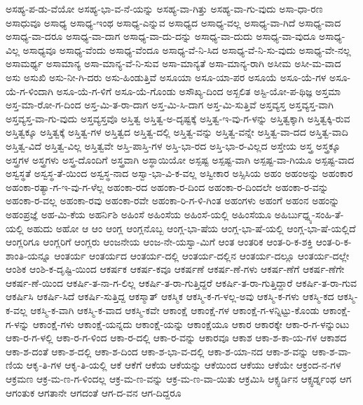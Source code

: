 {ಅಸಹ್ಯ-ಪ-ಡು-ವೆಯೋ
ಅಸಹ್ಯ-ಭಾ-ವ-ನೆ-ಯನ್ನು
ಅಸಹ್ಯ-ವಾ-ಗಿತ್ತು
ಅಸಹ್ಯ-ವಾ-ಗು-ವುದು
ಅಸಾ-ಧಾ-ರಣ
ಅಸಾಧುವೂ
ಅಸಾಧ್ಯ
ಅಸಾಧ್ಯ-ಇಂಥ
ಅಸಾಧ್ಯ-ಎನ್ನುವ
ಅಸಾಧ್ಯದ
ಅಸಾಧ್ಯ-ವಲ್ಲ
ಅಸಾಧ್ಯ-ವಾ-ಗಿದೆ
ಅಸಾಧ್ಯ-ವಾದ
ಅಸಾಧ್ಯ-ವಾ-ದರೂ
ಅಸಾಧ್ಯ-ವಾ-ದಾಗ
ಅಸಾಧ್ಯ-ವಾ-ದು-ದನ್ನು
ಅಸಾಧ್ಯ-ವಾ-ದುದು
ಅಸಾಧ್ಯ-ವಾ-ವುದೂ
ಅಸಾಧ್ಯ-ವಿಲ್ಲ
ಅಸಾಧ್ಯವೂ
ಅಸಾಧ್ಯ-ವೆಂದು
ಅಸಾಧ್ಯ-ವೆಂದೂ
ಅಸಾಧ್ಯ-ವೆ-ನಿ-ಸಿದ
ಅಸಾಧ್ಯ-ವೆ-ನಿ-ಸು-ವುದು
ಅಸಾಧ್ಯ-ವೇ-ನಲ್ಲ
ಅಸಾಮರ್ಥ್ಯ
ಅಸಾಮಾನ್ಯ
ಅಸಾ-ಮಾನ್ಯ-ವೆ-ನಿ-ಸುವ
ಅಸಾ-ಮಾನ್ಯತೆ
ಅಸಾ-ಮಾನ್ಯ-ರಾಗಿ
ಅಸೀಮ
ಅಸೀ-ಮ-ವಾದ
ಅಸು
ಅಸುಖಿ
ಅಸು-ನೀ-ಗಿ-ದರು
ಅಸು-ಹಿಂಡುತ್ತಿವೆ
ಅಸೂಯಾ
ಅಸೂ-ಯಾ-ಪರ
ಅಸೂಯೆ
ಅಸೂ-ಯೆ-ಗಳ
ಅಸೂ-ಯೆ-ಗ-ಳಿಂದಾಗಿ
ಅಸೂ-ಯೆ-ಗ-ಳಿಗೆ
ಅಸೂ-ಯೆ-ಗೊಂಡು
ಅಸೌಖ್ಯ-ದಿಂದ
ಅಸ್ಖಲಿತ
ಅಸ್ಟಿ-ಯೋ-ಪ-ಥಿಜ್ಞ
ಅಸ್ತಮಾ
ಅಸ್ತ-ಮಾ-ರೋ-ಗ-ದಿಂದ
ಅಸ್ತ-ಮಿ-ತ-ರಾ-ದಾಗ
ಅಸ್ತ-ಮಿ-ಸಿ-ದಾಗ
ಅಸ್ತ-ಮಿ-ಸುತ್ತಿವೆ
ಅಸ್ತವ್ಯಸ್ತ
ಅಸ್ತವ್ಯಸ್ತ-ವಾಗಿ
ಅಸ್ತವ್ಯಸ್ತ-ವಾ-ಗು-ವುದು
ಅಸ್ತವ್ಯಸ್ತವೊ
ಅಸ್ತಿತ್ವ
ಅಸ್ತಿತ್ವ-ಅ-ದೃಷ್ಟಕ್ಕೆ
ಅಸ್ತಿತ್ವ-ಇ-ವು-ಗ-ಳನ್ನು
ಅಸ್ತಿತ್ವಕ್ಕಾಗಿ
ಅಸ್ತಿತ್ವಕ್ಕಿ-ರುವ
ಅಸ್ತಿತ್ವಕ್ಕೂ
ಅಸ್ತಿತ್ವಕ್ಕೆ
ಅಸ್ತಿತ್ವ-ಗಳ
ಅಸ್ತಿತ್ವದ
ಅಸ್ತಿತ್ವ-ದಲ್ಲಿ
ಅಸ್ತಿತ್ವ-ವನ್ನು
ಅಸ್ತಿತ್ವ-ವನ್ನೇ
ಅಸ್ತಿತ್ವ-ವಾ-ದದ
ಅಸ್ತಿತ್ವ-ವಾದಿ
ಅಸ್ತಿತ್ವ-ವಿದೆ
ಅಸ್ತಿತ್ವ-ವಿಲ್ಲ
ಅಸ್ತಿತ್ವವೇ
ಅಸ್ತಿ-ಪಾಸ್ತಿ-ಗಳ
ಅಸ್ತಿ-ಭಾ-ರದ
ಅಸ್ತಿ-ಭಾ-ರ-ವಿಲ್ಲದ
ಅಸ್ತೇಯ
ಅಸ್ತ್ರ
ಅಸ್ತ್ರಕ್ಕೂ
ಅಸ್ತ್ರಗಳ
ಅಸ್ತ್ರಗಳು
ಅಸ್ತ್ರ-ದೊಂದಿಗೆ
ಅಸ್ತ್ರವಾಗಿ
ಅಸ್ಥಾಯಿಯೋ
ಅಸ್ಪಷ್ಟ
ಅಸ್ಪಷ್ಟ-ವಾಗಿ
ಅಸ್ಪಷ್ಟ-ವಾ-ಗಿಯೂ
ಅಸ್ಪಷ್ಟ-ವಾದ
ಅಸ್ವಸ್ಥತೆ
ಅಸ್ವಸ್ಥ-ತೆ-ಯಿಂದ
ಅಸ್ವಸ್ಥ-ನಾದ
ಅಸ್ವಾ-ಭಾ-ವಿ-ಕ-ವಲ್ಲ
ಅಸ್ವೀಕಾರ
ಅಸ್ಸಿಸಿಯ
ಅಹಂ
ಅಹಂಅನ್ನು
ಅಹಂಕಾರ
ಅಹಂಕಾ-ರತ್ಯಾ-ಗ-ಇ-ವು-ಗ-ಳೆಲ್ಲ
ಅಹಂಕಾ-ರದ
ಅಹಂಕಾ-ರ-ದಿಂದ
ಅಹಂಕಾ-ರ-ದಿಂದಲೇ
ಅಹಂಕಾ-ರ-ವನ್ನು
ಅಹಂಕಾ-ರ-ವಲ್ಲ
ಅಹಂಕಾ-ರವು
ಅಹಂಕಾ-ರವೇ
ಅಹಂಕಾ-ರಿ-ಗ-ಳಿ-ಗಿಂತ
ಅಹಂಗಳು
ಅಹಂಗೆ
ಅಹಂನ
ಅಹಂನ್ನು
ಅಹಂಪ್ರಜ್ಞೆ
ಅಹ-ಮಿ-ಕೆಯ
ಅಹರ್ನಿಶಿ
ಅಹಿಂಸೆ
ಅಹಿಂಸೆಯ
ಅಹಿಂಸೆ-ಯಲ್ಲಿ
ಅಹಿಂಸೆಯೂ
ಅಹಿರ್ಬುಧ್ನ್ಯ-ಸಂಹಿ-ತೆ-ಯಲ್ಲಿ
ಅಹುದು
ಅಹೋ
ಆ
ಆಂ
ಆಂಗ್ಲ
ಆಂಗ್ಲನೊಬ್ಬ
ಆಂಗ್ಲ-ಭಾ-ಷೆಯ
ಆಂಗ್ಲ-ಭಾ-ಷೆ-ಯಲ್ಲಿ
ಆಂಗ್ಲ-ಭಾ-ಷೆ-ಯಲ್ಲಿದೆ
ಆಂಗ್ಲರಿಗೂ
ಆಂಗ್ಲರಿಗೆ
ಆಂಗ್ಲರು
ಆಂಜನೇಯ
ಆಂಜ-ನೇ-ಯಸ್ವಾ-ಮಿಗೆ
ಆಂತ
ಆಂತರಿಕ
ಆಂತ-ರಿ-ಕ-ಶಕ್ತಿ
ಆಂತ-ರಿ-ಕ-ಶಾಂತಿ-ಯನ್ನೂ
ಆಂತರ್ಯ
ಆಂತರ್ಯದ
ಆಂತರ್ಯ-ದಲ್ಲಿ
ಆಂತರ್ಯ-ದಲ್ಲಿನ
ಆಂತರ್ಯ-ದಲ್ಲೂ
ಆಂತರ್ಯ-ದಲ್ಲೇ
ಆಂಶಿಕ
ಆಂಶಿ-ಕ-ದೃಷ್ಟಿ-ಯಿಂದ
ಆಕರ್ಷಕ
ಆಕರ್ಷ-ಕವೂ
ಆಕರ್ಷಣೆ
ಆಕರ್ಷ-ಣೆ-ಗಳು
ಆಕರ್ಷ-ಣೆಗೆ
ಆಕರ್ಷ-ಣೆಗೇ
ಆಕರ್ಷ-ಣೆ-ಯಿಂದ
ಆಕರ್ಷಿ-ತ-ನಾ-ಗ-ಲಿಲ್ಲ
ಆಕರ್ಷಿ-ತ-ರಾ-ಗುತ್ತಿದ್ದರೆ
ಆಕರ್ಷಿ-ತ-ರಾ-ಗುತ್ತಿದ್ದಾರೆ
ಆಕರ್ಷಿ-ತ-ರಾ-ಗುವ
ಆಕರ್ಷಿಸಿ
ಆಕರ್ಷಿ-ಸಿದೆ
ಆಕರ್ಷಿ-ಸುತ್ತಿದ್ದ
ಆಕಸ್ಮಾತ್
ಆಕಸ್ಮಿಕ
ಆಕಸ್ಮಿ-ಕ-ಗ-ಳಲ್ಲ-ಅವು
ಆಕಸ್ಮಿ-ಕ-ಗಳು
ಆಕಸ್ಮಿ-ಕದ
ಆಕಸ್ಮಿ-ಕ-ವಲ್ಲ
ಆಕಸ್ಮಿ-ಕ-ವಾಗಿ
ಆಕಸ್ಮಿ-ಕ-ವಾದ
ಆಕಸ್ಮಿ-ಕವೇ
ಆಕಾಂಕ್ಷೆ
ಆಕಾಂಕ್ಷೆ-ಗಳ
ಆಕಾಂಕ್ಷೆ-ಗ-ಳನ್ನಿಟ್ಟು-ಕೊಂಡು
ಆಕಾಂಕ್ಷೆ-ಗ-ಳನ್ನು
ಆಕಾಂಕ್ಷೆ-ಗಳು
ಆಕಾಂಕ್ಷೆ-ಯನ್ನದು
ಆಕಾಂಕ್ಷೆ-ಯನ್ನು
ಆಕಾಂಕ್ಷೆಯೂ
ಆಕಾರ
ಆಕಾರಕ್ಕೇ
ಆಕಾ-ರ-ಗ-ಳನ್ನುಂಟು
ಆಕಾ-ರ-ಗ-ಳಲ್ಲಿ
ಆಕಾ-ರ-ಗ-ಳಿಂದ
ಆಕಾ-ರ-ದಲ್ಲಿ
ಆಕಾ-ರ-ವನ್ನು
ಆಕಾರವೂ
ಆಕಾಶ
ಆಕಾ-ಶ-ಕಾ-ಯ-ಗಳ
ಆಕಾಶದ
ಆಕಾ-ಶ-ದಂತೆ
ಆಕಾ-ಶ-ದಲ್ಲಿ
ಆಕಾ-ಶ-ದಿಂದ
ಆಕಾ-ಶ-ಭಾ-ವ-ದಲ್ಲಿ
ಆಕಾ-ಶ-ಯಾ-ನದ
ಆಕಾ-ಶ-ವನ್ನು
ಆಕಾ-ಶ-ವಾ-ಣಿಯ
ಆಕೃ-ತಿ-ಗಳ
ಆಕೃ-ತಿ-ಯಲ್ಲಿ
ಆಕೆ
ಆಕೆಗೆ
ಆಕೆಯ
ಆಕೆಯನ್ನು
ಆಕೆಯಿಂದ
ಆಕೆಯು
ಆಕೆಯೇ
ಆಕ್ರಂದ-ನ-ಗಳ
ಆಕ್ರಮಣ
ಆಕ್ರ-ಮ-ಣ-ಗ-ಳಿಂದಲ್ಲ
ಆಕ್ರ-ಮ-ಣ-ವನ್ನು
ಆಕ್ರ-ಮ-ಣ-ವಾ-ಯಿತು
ಆಕ್ರಮಿಸಿ
ಆಕ್ಸ್ಫರ್ಡಿನ
ಆಕ್ಸ್ಫರ್ಡ್ನಂಥ
ಆಗ
ಆಗಂತುಕ
ಆಗತಾನೇ
ಆಗದಂತೆ
ಆಗ-ದ-ವನ
ಆಗ-ದಿದ್ದರೂ
}
